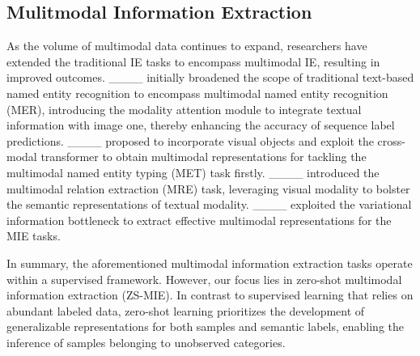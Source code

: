 \subsection{Mulitmodal Information Extraction}
%
As the volume of multimodal data continues to expand, researchers have extended
the traditional IE tasks to encompass multimodal IE, resulting in improved
outcomes.
%
____ initially broadened the scope of traditional
text-based named entity recognition to encompass multimodal named entity
recognition (MER), introducing the modality attention module to integrate
textual information with image one, thereby enhancing the accuracy of sequence
label predictions.
%
____ proposed to incorporate visual
objects and exploit the cross-modal transformer to obtain multimodal
representations for tackling the multimodal named entity typing (MET) task
firstly.
%
____ introduced the multimodal relation extraction
(MRE) task, leveraging visual modality to bolster the semantic representations
of textual modality.
%
____ exploited the variational information
bottleneck to extract effective multimodal representations for the MIE tasks.

In summary, the aforementioned multimodal information extraction tasks operate
within a supervised framework. However, our focus lies in zero-shot multimodal
information extraction (ZS-MIE). In contrast to supervised learning that relies
on abundant labeled data, zero-shot learning prioritizes the development of
generalizable representations for both samples and semantic labels, enabling the
inference of samples belonging to unobserved categories.
